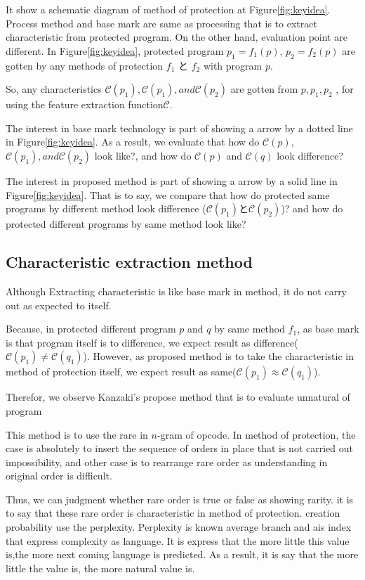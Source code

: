 \documentclass[conference]{IEEEtran}
\newcommand{\birth}[1]{\mathcal{C}(#1)}
\begin{document}
It show a schematic diagram of method of protection at Figure\ref{fig:keyidea}.
Process method and base mark are same as processing that is to extract characteristic from protected program.
On the other hand, evaluation point are different.
In Figure\ref{fig:keyidea}, protected program $p_1=f_1(p)$,
$p_2=f_2(p)$ are gotten by any methods of protection $f_1$ と $f_2$ with program $p$.

So, any characteristics $\birth{p_1}, \birth{p_1}, and \birth{p_2}$ are gotten from $p,
p_1, p_2$ , for using the feature extraction function$\mathcal{C}$.

The interest in base mark technology is part of showing a arrow by a dotted line in Figure\ref{fig:keyidea}.
As a result, we evaluate that how do $\birth{p}$, $\birth{p_1}, and \birth{p_2}$ look like?, and how do $\birth{p}$ and $\birth{q}$ look difference?


The interest in proposed method is part of showing a arrow by a solid line in Figure\ref{fig:keyidea}.
That is to say, we compare that how do protected same programs by different method look difference ($\birth{p_1}$と$\birth{p_2}$)? and how do protected different programs by same method look like?  


\subsection{Characteristic extraction method}
Although Extracting characteristic is like base mark in method,
it do not carry out as expected to itself.

Because, in protected different program $p$ and $q$ by same method $f_1$, as base mark is that program itself is to difference, we expect result as difference($\birth{p_1} \neq\birth{q_1}$).
However, as proposed method is to take the characteristic in method of protection itself, we expect result as same($\birth{p_1} \approx \birth{q_1}$).

Therefor, we observe Kanzaki's propose method that is to evaluate unnatural of program\cite{kanzaki14ipsj}

This method is to use the rare in $n$-gram of opcode.
In method of protection, the case is absolutely to insert the sequence of orders in place that is not carried out impossibility, and other case is to rearrange rare order as understanding in original order is difficult.

Thus, we can judgment whether rare order is true or false as showing rarity.
it is to say that these rare order is characteristic in method of protection.
creation probability use the perplexity\cite{gekka14scis}.
Perplexity is known average branch and ais index that express complexity as language.
It is express that the more little this value is,the more next coming language is predicted.
As a result, it is say that the more little the value is, the more natural value is.
\end{document}
